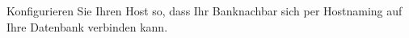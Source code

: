     \item Konfigurieren Sie Ihren Host so, dass Ihr Banknachbar sich per Hostnaming auf Ihre Datenbank verbinden kann.
